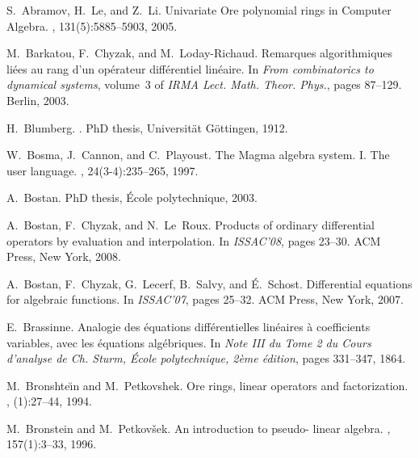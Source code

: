 \documentclass{sig-alt-full}
\begin{document}
\scriptsize

\def\cprime{'} \def\cprime{}
\begin{thebibliography}{10}

\medskip 

S.~Abramov, H.~Le, and Z.~Li.
\newblock Univariate {O}re polynomial rings in {C}omputer {A}lgebra.
, 131(5):5885--5903, 2005.

M.~Barkatou, F.~Chyzak, and M.~Loday-Richaud.
\newblock Remarques algorithmiques li\'ees au rang d'un op\'erateur
  diff\'erentiel lin\'eaire.
\newblock In {\em From combinatorics to dynamical systems}, volume~3 of {\em
  IRMA Lect. Math. Theor. Phys.}, pages 87--129. Berlin, 2003.

H.~Blumberg.
.
\newblock PhD thesis, Universit{\"a}t G{\"o}ttingen, 1912.

W.~Bosma, J.~Cannon, and C.~Playoust.
\newblock The {M}agma algebra system. {I}. {T}he user language.
, 24(3-4):235--265, 1997.

A.~Bostan.
\newblock PhD thesis, {\'E}cole polytechnique, 2003.

A.~Bostan, F.~Chyzak, and N.~Le~Roux.
\newblock Products of ordinary differential operators by evaluation and
  interpolation.
\newblock In {\em I{SSAC}'08}, pages 23--30. ACM Press, New York, 2008.

A.~Bostan, F.~Chyzak, G.~Lecerf, B.~Salvy, and {\'E}.~Schost.
\newblock Differential equations for algebraic functions.
\newblock In {\em I{SSAC}'07}, pages 25--32. ACM Press, New York, 2007.

E.~Brassinne.
\newblock Analogie des \'equations diff\'erentielles lin\'eaires \`a
  coefficients variables, avec les \'equations alg\'ebriques.
\newblock In {\em Note III du Tome 2 du Cours d'analyse de Ch. Sturm, {\'E}cole
  polytechnique, 2\`eme \'edition}, pages 331--347, 1864.

M.~Bronshte{\u\i}n and M.~Petkovshek.
\newblock Ore rings, linear operators and factorization.
, (1):27--44, 1994.

M.~Bronstein and M.~Petkov{\v{s}}ek.
\newblock An introduction to pseudo- li\-near algebra.
, 157(1):3--33, 1996.


\end{thebibliography}
\end{document}
